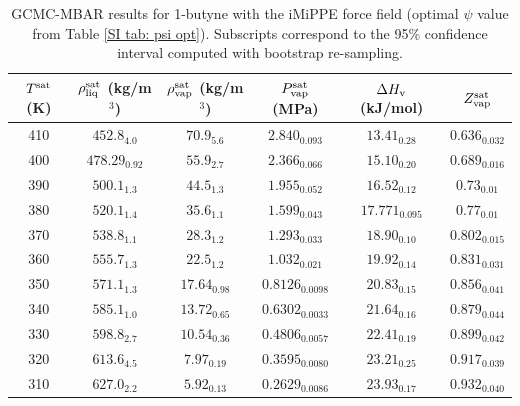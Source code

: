 \documentclass[journal=jctc,manuscript=article]{achemso}
\begin{document}
\begin{table}[htb!]
	\caption{GCMC-MBAR results for 1-butyne with the iMiPPE force field (optimal $\psi$ value from Table \ref{SI tab: psi opt}). Subscripts correspond to the 95\% confidence interval computed with bootstrap re-sampling.}
	\begin{center}
		\begin{tabular}{|c|c|c|c|c|c|}
			\hline
			$T^{\rm sat}$ (K) & $\rho_{\rm liq}^{\rm sat}$ (kg/m$^3$) & $\rho_{\rm vap}^{\rm sat}$ (kg/m$^3$) & $P_{\rm vap}^{\rm sat}$ (MPa) & $\Delta H_{\rm v}$ (kJ/mol) & $Z_{\rm vap}^{\rm sat}$ \\ \hline
			410 & $452.8_{4.0}$ & $70.9_{5.6}$ & $2.840_{0.093}$ & $13.41_{0.28}$ & $0.636_{0.032}$ \\
			400 & $478.29_{0.92}$ & $55.9_{2.7}$ & $2.366_{0.066}$ & $15.10_{0.20}$ & $0.689_{0.016}$ \\
			390 & $500.1_{1.3}$ & $44.5_{1.3}$ & $1.955_{0.052}$ & $16.52_{0.12}$ & $0.73_{0.01}$ \\
			380 & $520.1_{1.4}$ & $35.6_{1.1}$ & $1.599_{0.043}$ & $17.771_{0.095}$ & $0.77_{0.01}$ \\
			370 & $538.8_{1.1}$ & $28.3_{1.2}$ & $1.293_{0.033}$ & $18.90_{0.10}$ & $0.802_{0.015}$ \\
			360 & $555.7_{1.3}$ & $22.5_{1.2}$ & $1.032_{0.021}$ & $19.92_{0.14}$ & $0.831_{0.031}$ \\
			350 & $571.1_{1.3}$ & $17.64_{0.98}$ & $0.8126_{0.0098}$ & $20.83_{0.15}$ & $0.856_{0.041}$ \\
			340 & $585.1_{1.0}$ & $13.72_{0.65}$ & $0.6302_{0.0033}$ & $21.64_{0.16}$ & $0.879_{0.044}$ \\
			330 & $598.8_{2.7}$ & $10.54_{0.36}$ & $0.4806_{0.0057}$ & $22.41_{0.19}$ & $0.899_{0.042}$ \\
			320 & $613.6_{4.5}$ & $7.97_{0.19}$ & $0.3595_{0.0080}$ & $23.21_{0.25}$ & $0.917_{0.039}$ \\
			310 & $627.0_{2.2}$ & $5.92_{0.13}$ & $0.2629_{0.0086}$ & $23.93_{0.17}$ & $0.932_{0.040}$ \\
			\hline
		\end{tabular}
	\end{center}
\end{table}
\end{document}
